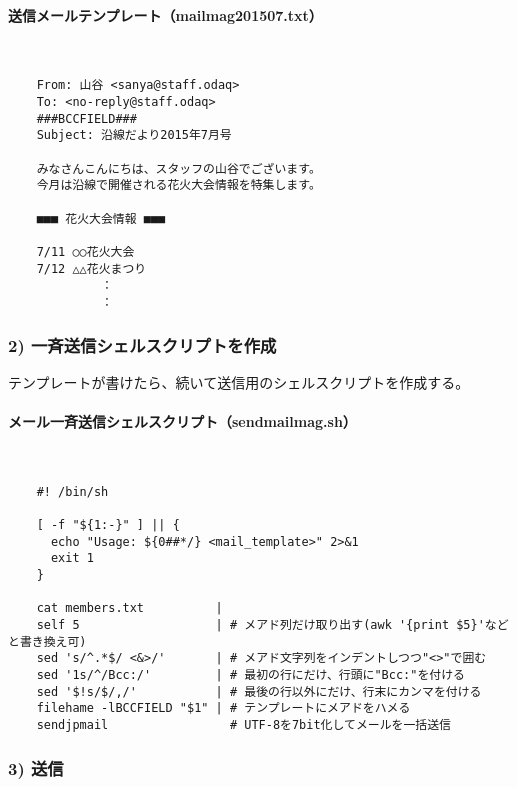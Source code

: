 \paragraph{送信メールテンプレート（mailmag201507.txt）}　\\
\begin{frameboxit}{160.0mm}
\begin{verbatim}
	From: 山谷 <sanya@staff.odaq>
	To: <no-reply@staff.odaq>
	###BCCFIELD###
	Subject: 沿線だより2015年7月号

	みなさんこんにちは、スタッフの山谷でございます。
	今月は沿線で開催される花火大会情報を特集します。

	■■■ 花火大会情報 ■■■

	7/11 ○○花火大会
	7/12 △△花火まつり
	         ：
	         ：
\end{verbatim}
\end{frameboxit}

\subsubsection*{2) 一斉送信シェルスクリプトを作成}

テンプレートが書けたら、続いて送信用のシェルスクリプトを作成する。

\paragraph{メール一斉送信シェルスクリプト（sendmailmag.sh）}　\\
\begin{frameboxit}{160.0mm}
\begin{verbatim}
	#! /bin/sh

	[ -f "${1:-}" ] || {
	  echo "Usage: ${0##*/} <mail_template>" 2>&1
	  exit 1
	}

	cat members.txt          |
	self 5                   | # メアド列だけ取り出す(awk '{print $5}'などと書き換え可)
	sed 's/^.*$/ <&>/'       | # メアド文字列をインデントしつつ"<>"で囲む
	sed '1s/^/Bcc:/'         | # 最初の行にだけ、行頭に"Bcc:"を付ける
	sed '$!s/$/,/'           | # 最後の行以外にだけ、行末にカンマを付ける
	filehame -lBCCFIELD "$1" | # テンプレートにメアドをハメる
	sendjpmail                 # UTF-8を7bit化してメールを一括送信
\end{verbatim}
\end{frameboxit}

\subsubsection*{3) 送信}

